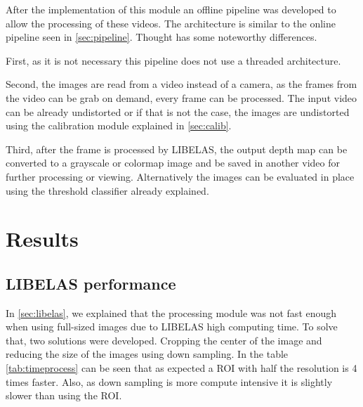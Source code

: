 \documentclass[10pt,a4paper,twocolumn,twoside]{article}
\begin{document}
	After the implementation of this module an offline pipeline was developed to allow the processing of these videos. The architecture is similar to the online pipeline seen in \ref{sec:pipeline}. Thought has some noteworthy differences.  
	
	First, as it is not necessary this pipeline does not use a threaded architecture.
	
	Second, the images are read from a video instead of a camera, as the frames from the video can be grab on demand, every frame can be processed. The input video can be already undistorted or if that is not the case, the images are undistorted using the calibration module explained in \ref{sec:calib}. 
	
	Third, after the frame is processed by LIBELAS, the output depth map can be converted to a grayscale or colormap image and be saved in another video for further processing or viewing. Alternatively the images can be evaluated in place using the threshold classifier already explained.  
	

	
	\section{Results}
	
	
	\subsection{LIBELAS performance}
	\label{sec:resizeperformance}
	In \ref{sec:libelas}, we explained that the processing module was not fast enough when using full-sized images due to LIBELAS high computing time. To solve that, two solutions were developed. Cropping the center of the image and reducing the size of the images using down sampling. In the table \ref{tab:timeprocess} can be seen that as expected a ROI with half the resolution is 4 times faster. Also, as down sampling is more compute intensive it is slightly slower than using the ROI.  
	
\end{document}
